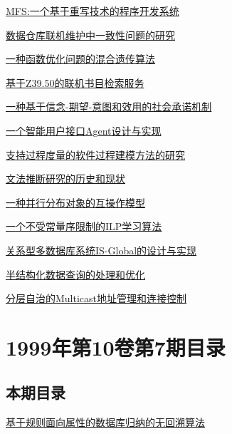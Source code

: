 \documentclass[a4paper]{article}
\begin{document}
\href{http://www.jos.org.cn/ch/reader/download_pdf.aspx?file_no=19990804&year_id=1999&quarter_id=8&falg=1}{MFS:一个基于重写技术的程序开发系统}

\href{http://www.jos.org.cn/ch/reader/download_pdf.aspx?file_no=19990805&year_id=1999&quarter_id=8&falg=1}{数据仓库联机维护中一致性问题的研究}

\href{http://www.jos.org.cn/ch/reader/download_pdf.aspx?file_no=19990806&year_id=1999&quarter_id=8&falg=1}{一种函数优化问题的混合遗传算法}

\href{http://www.jos.org.cn/ch/reader/download_pdf.aspx?file_no=19990807&year_id=1999&quarter_id=8&falg=1}{基于Z39.50的联机书目检索服务}

\href{http://www.jos.org.cn/ch/reader/download_pdf.aspx?file_no=19990808&year_id=1999&quarter_id=8&falg=1}{一种基于信念-期望-意图和效用的社会承诺机制}

\href{http://www.jos.org.cn/ch/reader/download_pdf.aspx?file_no=19990809&year_id=1999&quarter_id=8&falg=1}{一个智能用户接口Agent设计与实现}

\href{http://www.jos.org.cn/ch/reader/download_pdf.aspx?file_no=19990810&year_id=1999&quarter_id=8&falg=1}{支持过程度量的软件过程建模方法的研究}

\href{http://www.jos.org.cn/ch/reader/download_pdf.aspx?file_no=19990811&year_id=1999&quarter_id=8&falg=1}{文法推断研究的历史和现状}

\href{http://www.jos.org.cn/ch/reader/download_pdf.aspx?file_no=19990812&year_id=1999&quarter_id=8&falg=1}{一种并行分布对象的互操作模型}

\href{http://www.jos.org.cn/ch/reader/download_pdf.aspx?file_no=19990813&year_id=1999&quarter_id=8&falg=1}{一个不受常量序限制的ILP学习算法}

\href{http://www.jos.org.cn/ch/reader/download_pdf.aspx?file_no=19990814&year_id=1999&quarter_id=8&falg=1}{关系型多数据库系统IS-Global的设计与实现}

\href{http://www.jos.org.cn/ch/reader/download_pdf.aspx?file_no=19990815&year_id=1999&quarter_id=8&falg=1}{半结构化数据查询的处理和优化}

\href{http://www.jos.org.cn/ch/reader/download_pdf.aspx?file_no=19990816&year_id=1999&quarter_id=8&falg=1}{分层自治的Multicast地址管理和连接控制}


\section{\textbf{1999年第10卷第7期目录}}
\subsection{本期目录}
\href{http://www.jos.org.cn/ch/reader/download_pdf.aspx?file_no=19990701&year_id=1999&quarter_id=7&falg=1}{基于规则面向属性的数据库归纳的无回溯算法}
\end{document}
